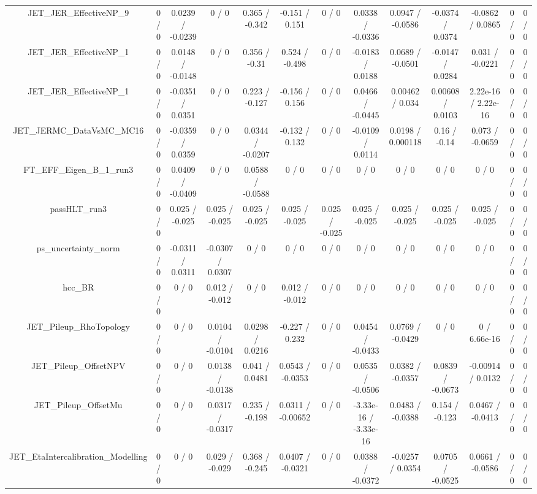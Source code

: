 \documentclass[10pt]{article}
\begin{document}
\begin{table}[htbp]
\begin{center}
\begin{tabular}{|c|c|c|c|c|c|c|c|c|c|c|c|c|}
  JET_JER_EffectiveNP_9 & 0 / 0 & 0.0239 / -0.0239 & 0 / 0 & 0.365 / -0.342 & -0.151 / 0.151 & 0 / 0 & 0.0338 / -0.0336 & 0.0947 / -0.0586 & -0.0374 / 0.0374 & -0.0862 / 0.0865 & 0 / 0 & 0 / 0 \\ 
  JET_JER_EffectiveNP_1 & 0 / 0 & 0.0148 / -0.0148 & 0 / 0 & 0.356 / -0.31 & 0.524 / -0.498 & 0 / 0 & -0.0183 / 0.0188 & 0.0689 / -0.0501 & -0.0147 / 0.0284 & 0.031 / -0.0221 & 0 / 0 & 0 / 0 \\ 
  JET_JER_EffectiveNP_1 & 0 / 0 & -0.0351 / 0.0351 & 0 / 0 & 0.223 / -0.127 & -0.156 / 0.156 & 0 / 0 & 0.0466 / -0.0445 & 0.00462 / 0.034 & 0.00608 / 0.0103 & 2.22e-16 / 2.22e-16 & 0 / 0 & 0 / 0 \\ 
  JET_JERMC_DataVsMC_MC16 & 0 / 0 & -0.0359 / 0.0359 & 0 / 0 & 0.0344 / -0.0207 & -0.132 / 0.132 & 0 / 0 & -0.0109 / 0.0114 & 0.0198 / 0.000118 & 0.16 / -0.14 & 0.073 / -0.0659 & 0 / 0 & 0 / 0 \\ 
  FT_EFF_Eigen_B_1_run3 & 0 / 0 & 0.0409 / -0.0409 & 0 / 0 & 0.0588 / -0.0588 & 0 / 0 & 0 / 0 & 0 / 0 & 0 / 0 & 0 / 0 & 0 / 0 & 0 / 0 & 0 / 0 \\ 
  passHLT_run3 & 0 / 0 & 0.025 / -0.025 & 0.025 / -0.025 & 0.025 / -0.025 & 0.025 / -0.025 & 0.025 / -0.025 & 0.025 / -0.025 & 0.025 / -0.025 & 0.025 / -0.025 & 0.025 / -0.025 & 0 / 0 & 0 / 0 \\ 
  ps_uncertainty_norm & 0 / 0 & -0.0311 / 0.0311 & -0.0307 / 0.0307 & 0 / 0 & 0 / 0 & 0 / 0 & 0 / 0 & 0 / 0 & 0 / 0 & 0 / 0 & 0 / 0 & 0 / 0 \\ 
  hcc_BR & 0 / 0 & 0 / 0 & 0.012 / -0.012 & 0 / 0 & 0.012 / -0.012 & 0 / 0 & 0 / 0 & 0 / 0 & 0 / 0 & 0 / 0 & 0 / 0 & 0 / 0 \\ 
  JET_Pileup_RhoTopology & 0 / 0 & 0 / 0 & 0.0104 / -0.0104 & 0.0298 / 0.0216 & -0.227 / 0.232 & 0 / 0 & 0.0454 / -0.0433 & 0.0769 / -0.0429 & 0 / 0 & 0 / 6.66e-16 & 0 / 0 & 0 / 0 \\ 
  JET_Pileup_OffsetNPV & 0 / 0 & 0 / 0 & 0.0138 / -0.0138 & 0.041 / 0.0481 & 0.0543 / -0.0353 & 0 / 0 & 0.0535 / -0.0506 & 0.0382 / -0.0357 & 0.0839 / -0.0673 & -0.00914 / 0.0132 & 0 / 0 & 0 / 0 \\ 
  JET_Pileup_OffsetMu & 0 / 0 & 0 / 0 & 0.0317 / -0.0317 & 0.235 / -0.198 & 0.0311 / -0.00652 & 0 / 0 & -3.33e-16 / -3.33e-16 & 0.0483 / -0.0388 & 0.154 / -0.123 & 0.0467 / -0.0413 & 0 / 0 & 0 / 0 \\ 
  JET_EtaIntercalibration_Modelling & 0 / 0 & 0 / 0 & 0.029 / -0.029 & 0.368 / -0.245 & 0.0407 / -0.0321 & 0 / 0 & 0.0388 / -0.0372 & -0.0257 / 0.0354 & 0.0705 / -0.0525 & 0.0661 / -0.0586 & 0 / 0 & 0 / 0 \\ 

\end{tabular}
\end{center}
\end{table}
\end{document}
